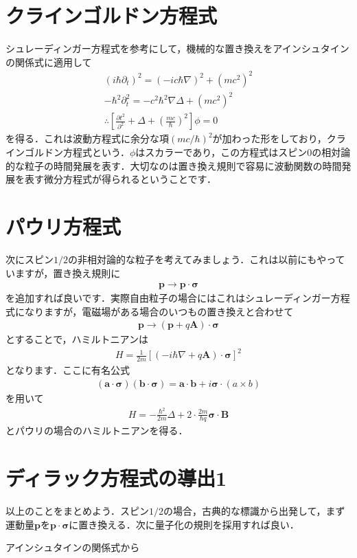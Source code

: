 \documentclass[a4j]{jarticle}
\begin{document}
\section{クラインゴルドン方程式}
シュレーディンガー方程式を参考にして，機械的な置き換えをアインシュタインの関係式に適用して
\begin{align*}
 \left(i\hbar\partial_t\right)^2=\left(-ic\hbar\nabla\right)^2+(mc^2)^2 \\
 -\hbar^2\partial_t^2=-c^2\hbar^2\nabla\Delta+(mc^2)^2 \\
　\therefore \left[\frac{\partial t^2}{\partial^2}+\Delta+\left(\frac{mc}{\hbar}\right)^2\right]\phi=0
\end{align*}
を得る．これは波動方程式に余分な項$(mc/\hbar)^2$が加わった形をしており，クラインゴルドン方程式という．$\phi$はスカラーであり，この方程式はスピン$0$の相対論的な粒子の時間発展を表す．大切なのは置き換え規則で容易に波動関数の時間発展を表す微分方程式が得られるということです．


\section{パウリ方程式}
次にスピン$1/2$の非相対論的な粒子を考えてみましょう．これは以前にもやっていますが，置き換え規則に
\begin{align*}
 \bm{p}\to \bm{p}\cdot \bm{\sigma} 
\end{align*}
を追加すれば良いです．実際自由粒子の場合にはこれはシュレーディンガー方程式になりますが，電磁場がある場合のいつもの置き換えと合わせて
 \begin{align*}
  \bm{p}\to \left(\bm{p}+q\bm{A}\right)\cdot \bm{\sigma} 
 \end{align*}
 とすることで，ハミルトニアンは
 \begin{align*}
  H=\frac{1}{2m}\left[\left(-i\hbar\nabla +q\bm{A}\right)\cdot \bm{\sigma}\right]^2
 \end{align*}
 となります．ここに有名公式
 \begin{align*}
  \left(\bm{a}\cdot\bm{\sigma}\right)\left(\bm{b}\cdot\bm{\sigma}\right)=\bm{a}\cdot\bm{b}+i\bm{\sigma}\cdot\left(a\times b\right)
 \end{align*}
 を用いて
 \begin{align*}
  H=-\frac{\hbar^2}{2m}\Delta+2\cdot\frac{2m}{\hbar q}\bm{\sigma}\cdot\bm{B}
 \end{align*}
とパウリの場合のハミルトニアンを得る．


\section{ディラック方程式の導出1}
以上のことをまとめよう．スピン$1/2$の場合，古典的な標識から出発して，まず運動量$\bm{p}$を$\bm{p}\cdot\bm{\sigma}$に置き換える．次に量子化の規則を採用すれば良い．

アインシュタインの関係式から
\end{document}
